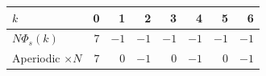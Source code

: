 \begin{tabular}{l*{7}{r}}
\toprule
$k$ & 0 & 1 & 2 & 3 & 4 & 5 & 6 \\
\midrule
$N\Phi_s(k)$ & $7$ & $-1$ & $-1$ & $-1$ & $-1$ & $-1$ & $-1$ \\
Aperiodic $\times N$ & $7$ & $0$ & $-1$ & $0$ & $-1$ & $0$ & $-1$ \\
\bottomrule
\end{tabular}
